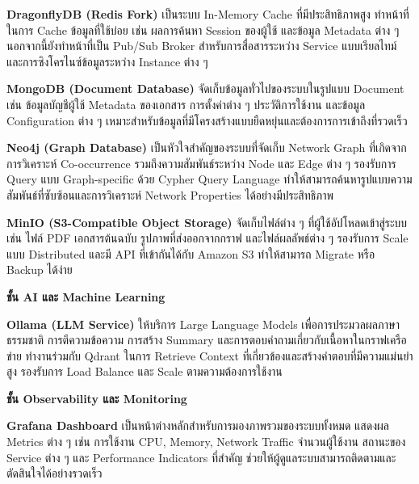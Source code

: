 \documentclass[12pt,a4paper]{article}
\begin{document}
\begin{enumerate}[leftmargin=2cm]
\begin{enumerate}
{            \hspace{1cm}\textbf{DragonflyDB (Redis Fork)} เป็นระบบ In-Memory Cache ที่มีประสิทธิภาพสูง ทำหน้าที่ในการ Cache ข้อมูลที่ใช้บ่อย เช่น ผลการค้นหา Session ของผู้ใช้ และข้อมูล Metadata ต่าง ๆ นอกจากนี้ยังทำหน้าที่เป็น Pub/Sub Broker สำหรับการสื่อสารระหว่าง Service แบบเรียลไทม์ และการซิงโครไนซ์ข้อมูลระหว่าง Instance ต่าง ๆ

            \hspace{1cm}\textbf{MongoDB (Document Database)} จัดเก็บข้อมูลทั่วไปของระบบในรูปแบบ Document เช่น ข้อมูลบัญชีผู้ใช้ Metadata ของเอกสาร การตั้งค่าต่าง ๆ ประวัติการใช้งาน และข้อมูล Configuration ต่าง ๆ เหมาะสำหรับข้อมูลที่มีโครงสร้างแบบยืดหยุ่นและต้องการการเข้าถึงที่รวดเร็ว

            \hspace{1cm}\textbf{Neo4j (Graph Database)} เป็นหัวใจสำคัญของระบบที่จัดเก็บ Network Graph ที่เกิดจากการวิเคราะห์ Co-occurrence รวมถึงความสัมพันธ์ระหว่าง Node และ Edge ต่าง ๆ รองรับการ Query แบบ Graph-specific ด้วย Cypher Query Language ทำให้สามารถค้นหารูปแบบความสัมพันธ์ที่ซับซ้อนและการวิเคราะห์ Network Properties ได้อย่างมีประสิทธิภาพ

            \hspace{1cm}\textbf{MinIO (S3-Compatible Object Storage)} จัดเก็บไฟล์ต่าง ๆ ที่ผู้ใช้อัปโหลดเข้าสู่ระบบ เช่น ไฟล์ PDF เอกสารต้นฉบับ รูปภาพที่ส่งออกจากกราฟ และไฟล์ผลลัพธ์ต่าง ๆ รองรับการ Scale แบบ Distributed และมี API ที่เข้ากันได้กับ Amazon S3 ทำให้สามารถ Migrate หรือ Backup ได้ง่าย

            \vspace{0.3cm}

            \textbf{ชั้น AI และ Machine Learning}

            \hspace{1cm}\textbf{Ollama (LLM Service)} ให้บริการ Large Language Models เพื่อการประมวลผลภาษาธรรมชาติ การตีความข้อความ การสร้าง Summary และการตอบคำถามเกี่ยวกับเนื้อหาในกราฟเครือข่าย ทำงานร่วมกับ Qdrant ในการ Retrieve Context ที่เกี่ยวข้องและสร้างคำตอบที่มีความแม่นยำสูง รองรับการ Load Balance และ Scale ตามความต้องการใช้งาน

            \vspace{0.3cm}

            \textbf{ชั้น Observability และ Monitoring}

            \hspace{1cm}\textbf{Grafana Dashboard} เป็นหน้าต่างหลักสำหรับการมองภาพรวมของระบบทั้งหมด แสดงผล Metrics ต่าง ๆ เช่น การใช้งาน CPU, Memory, Network Traffic จำนวนผู้ใช้งาน สถานะของ Service ต่าง ๆ และ Performance Indicators ที่สำคัญ ช่วยให้ผู้ดูแลระบบสามารถติดตามและตัดสินใจได้อย่างรวดเร็ว

}
\end{enumerate}
\end{enumerate}
\end{document}
